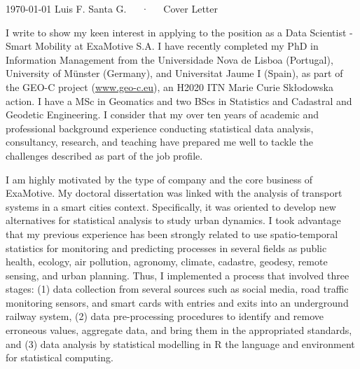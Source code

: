 \documentclass[11pt, a4paper]{awesome-cv}
\begin{document}
\makecvheader[R]

\makecvfooter
  {\today}
    {Luis F. Santa G.~~~·~~~Cover Letter}
  {}

\makelettertitle

\begin{cvletter}
I write to show my keen interest in applying to the position as a Data Scientist - Smart Mobility at ExaMotive S.A. I have recently completed my PhD in Information Management from the Universidade Nova de Lisboa (Portugal), University of Münster (Germany), and Universitat Jaume I (Spain), as part of the GEO-C project (\url{www.geo-c.eu}), an H2020 ITN Marie Curie Skłodowska action. I have a MSc in Geomatics and two BScs in Statistics and Cadastral and Geodetic Engineering. I consider that my over ten years of academic and professional background experience conducting statistical data analysis, consultancy, research, and teaching have prepared me well to tackle the challenges described as part of the job profile.\par 
I am highly motivated by the type of company and the core business of ExaMotive. My doctoral dissertation was linked with the analysis of transport systems in a smart cities context. Specifically, it was oriented to develop new alternatives for statistical analysis to study urban dynamics. I took advantage that my previous experience has been strongly related to use spatio-temporal statistics for monitoring and predicting processes in several fields as public health, ecology, air pollution, agronomy, climate, cadastre, geodesy, remote sensing, and urban planning. Thus, I implemented a process that involved three stages: (1) data collection from several sources such as social media, road traffic monitoring sensors, and smart cards with entries and exits into an underground railway system, (2) data pre-processing procedures to identify and remove erroneous values, aggregate data, and bring them in the appropriated standards, and (3) data analysis by statistical modelling in R the language and environment for statistical computing.\par

\end{cvletter}
\end{document}
